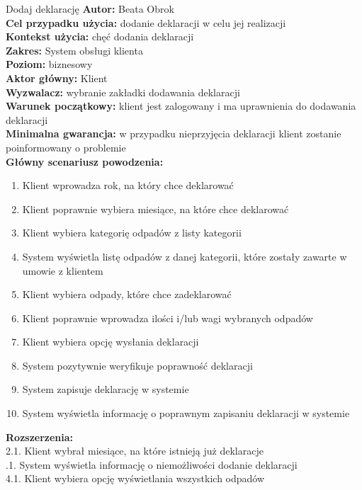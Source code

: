 \begin{usecase}{Dodaj deklarację}
	\textbf{Autor:} Beata Obrok \\
	\textbf{Cel przypadku użycia:} dodanie deklaracji w celu jej realizacji \\
	\textbf{Kontekst użycia:} chęć dodania deklaracji \\
	\textbf{Zakres:} System obsługi klienta \\
	\textbf{Poziom:} biznesowy \\
	\textbf{Aktor główny:} Klient \\
	\textbf{Wyzwalacz:} wybranie zakładki dodawania deklaracji \\
	\textbf{Warunek początkowy:} klient jest zalogowany i ma uprawnienia do dodawania deklaracji \\
	\textbf{Minimalna gwarancja:} w przypadku nieprzyjęcia deklaracji klient zostanie poinformowany o problemie \\
	\textbf{Główny scenariusz powodzenia:} \\
		\begin{enumerate}
			\item Klient wprowadza rok, na który chce deklarować
			\item Klient poprawnie wybiera miesiące, na które chce deklarować
			\item Klient wybiera kategorię odpadów z listy kategorii
			\item System wyświetla listę odpadów z danej kategorii, które zostały zawarte w umowie z klientem
			\item Klient wybiera odpady, które chce zadeklarować
			\item Klient poprawnie wprowadza ilości i/lub wagi wybranych odpadów
			\item Klient wybiera opcję wysłania deklaracji
			\item System pozytywnie weryfikuje poprawność deklaracji
			\item System zapisuje deklarację w systemie
			\item System wyświetla informację o poprawnym zapisaniu deklaracji w systemie
		\end{enumerate}
	\textbf{Rozszerzenia:} \\
		2.1. Klient wybrał miesiące, na które istnieją już deklaracje \\
			.1. System wyświetla informację o niemożliwości dodanie deklaracji \\
		4.1. Klient wybiera opcję wyświetlania wszystkich odpadów \\

\end{usecase}
